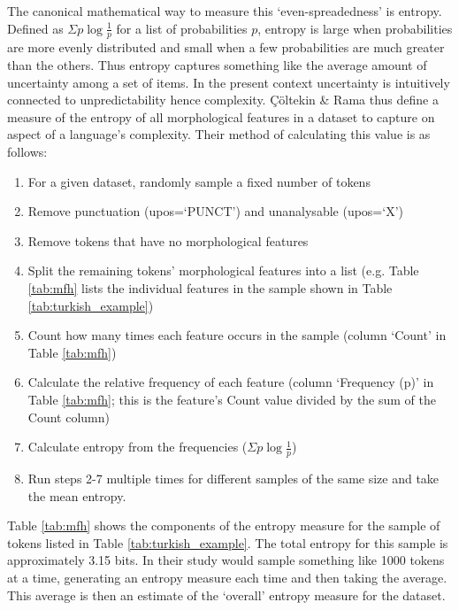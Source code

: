 \documentclass[a4paper]{article}
\begin{document}
The canonical mathematical way to measure this `even-spreadedness' is entropy.
Defined as $\Sigma p \log{\frac{1}{p}}$ for a list of probabilities $p$, entropy is large when probabilities are more evenly distributed and small when a few probabilities are much greater than the others.
Thus entropy captures something like the average amount of uncertainty among a set of items.
In the present context uncertainty is intuitively connected to unpredictability hence complexity.
Çöltekin \& Rama thus define a measure of the entropy of all morphological features in a dataset to capture on aspect of a language's complexity.
Their method of calculating this value is as follows:
\begin{enumerate}
\item For a given dataset, randomly sample a fixed number of tokens
\item Remove punctuation (upos=`PUNCT') and unanalysable (upos=`X')
\item Remove tokens that have no morphological features
\item Split the remaining tokens' morphological features into a list (e.g. Table \ref{tab:mfh} lists the individual features in the sample shown in Table \ref{tab:turkish_example})
\item Count how many times each feature occurs in the sample (column `Count' in Table \ref{tab:mfh})
\item Calculate the relative frequency of each feature (column `Frequency (p)' in Table \ref{tab:mfh}; this is the feature's Count value divided by the sum of the Count column)
\item Calculate entropy from the frequencies ($\Sigma p \log{\frac{1}{p}}$)
\item Run steps 2-7 multiple times for different samples of the same size and take the mean entropy.
\end{enumerate}

\noindent Table \ref{tab:mfh} shows the components of the entropy measure for the sample of tokens listed in Table \ref{tab:turkish_example}.
The total entropy for this sample is approximately 3.15 bits.
In their study \citet{ccoltekin2023complexity} would sample something like 1000 tokens at a time, generating an entropy measure each time and then taking the average.
This average is then an estimate of the `overall' entropy measure for the dataset.
\end{document}
